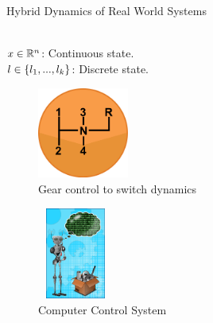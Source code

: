 \begin{frame}{Hybrid Dynamics of Real World Systems}
\begin{minipage}{0.45\textwidth}
\begin{tikzpicture}[scale =0.8,
location/.style = {circle, draw=red!60, thick, fill = cyan!5}, 
]
\end{tikzpicture}\\[0.5em]
%
$x\in\reals^n$: Continuous state.\\
$l\in\set{l_1,...,l_k}$: Discrete state.
\end{minipage}

\begin{minipage}{0.45\textwidth}
\begin{figure}
\center
\includegraphics[width = 3cm, height = 3cm]{figures/downloaded/CarGear.png}
\caption{\small Gear control to switch dynamics}
\end{figure}
\end{minipage}
%
\begin{minipage}{0.45\textwidth}
\begin{figure}
\includegraphics[height = 3cm, width = 2.5cm]{figures/downloaded/ComputerControl.jpg}
\caption{\small Computer Control System}
\end{figure}
\end{minipage}

\end{frame}



